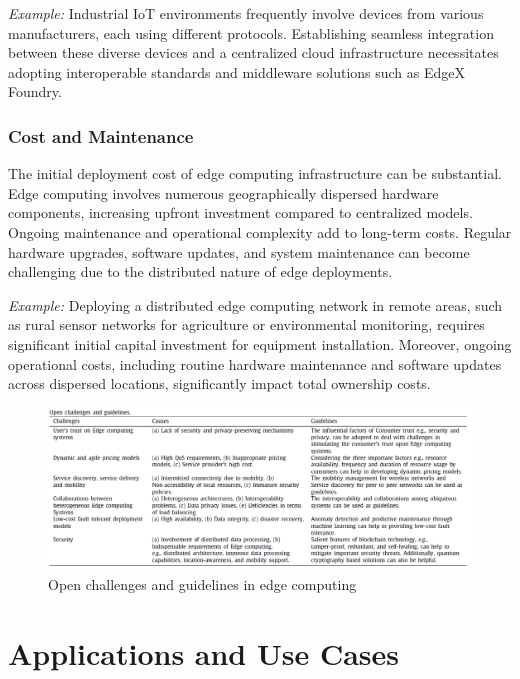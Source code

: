 \documentclass[runningheads]{llncs}
\begin{document}
\noindent\textit{Example:} Industrial IoT environments frequently involve devices from various manufacturers, each using different protocols. Establishing seamless integration between these diverse devices and a centralized cloud infrastructure necessitates adopting interoperable standards and middleware solutions such as EdgeX Foundry.

\subsubsection{Cost and Maintenance}
The initial deployment cost of edge computing infrastructure can be substantial. Edge computing involves numerous geographically dispersed hardware components, increasing upfront investment compared to centralized models. Ongoing maintenance and operational complexity add to long-term costs. Regular hardware upgrades, software updates, and system maintenance can become challenging due to the distributed nature of edge deployments.

\noindent\textit{Example:} Deploying a distributed edge computing network in remote areas, such as rural sensor networks for agriculture or environmental monitoring, requires significant initial capital investment for equipment installation. Moreover, ongoing operational costs, including routine hardware maintenance and software updates across dispersed locations, significantly impact total ownership costs.

\begin{figure}[ht]
    \centering
    \includegraphics[width=\textwidth]{IMG/3.png}
    \caption{Open challenges and guidelines in edge computing}
    \label{fig:open_challenges_guidelines}
    \end{figure}
\FloatBarrier

\section{Applications and Use Cases}
\end{document}
